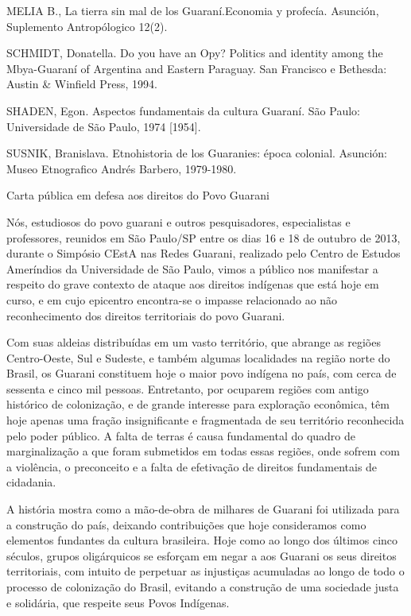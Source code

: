 \documentclass{article}
\begin{document}
MELIA B., La tierra sin mal de los Guaran\'i.Economia y profec\'ia.
Asunci\'on, Suplemento Antrop\'ologico 12(2).

SCHMIDT, Donatella. Do you have an Opy? Politics and identity among the
Mbya-Guaran\'i of Argentina and Eastern Paraguay. San Francisco e
Bethesda: Austin \& Winfield Press, 1994.

SHADEN, Egon. Aspectos fundamentais da cultura Guaran\'i. S\~ao Paulo:
Universidade de S\~ao Paulo, 1974 [1954].

SUSNIK, Branislava. Etnohistoria de los Guaranies: \'epoca colonial.
Asunci\'on: Museo Etnografico Andr\'es Barbero, 1979-1980.

Carta p\'ublica em defesa aos direitos do Povo Guarani

N\'os, estudiosos do povo guarani e outros pesquisadores, especialistas
e professores, reunidos em S\~ao Paulo/SP entre os dias 16 e 18 de
outubro de 2013, durante o Simp\'osio CEstA nas Redes Guarani,
realizado pelo Centro de Estudos Amer\'indios da Universidade de S\~ao
Paulo, vimos a p\'ublico nos manifestar a respeito do grave contexto de
ataque aos direitos ind\'igenas que est\'a hoje em curso, e em cujo
epicentro encontra-se o impasse relacionado ao n\~ao reconhecimento dos
direitos territoriais do povo Guarani.

Com suas aldeias distribu\'idas em um vasto territ\'orio, que abrange as
regi\~oes Centro-Oeste, Sul e Sudeste, e tamb\'em algumas localidades
na regi\~ao norte do Brasil, os Guarani constituem hoje o maior povo
ind\'igena no pa\'is, com cerca de sessenta e cinco mil pessoas.
Entretanto, por ocuparem regi\~oes com antigo hist\'orico de
coloniza\c{c}\~ao, e de grande interesse para explora\c{c}\~ao
econ\^omica, t\^em hoje apenas uma fra\c{c}\~ao insignificante e
fragmentada de seu territ\'orio reconhecida pelo poder p\'ublico. A
falta de terras \'e causa fundamental do quadro de marginaliza\c{c}\~ao
a que foram submetidos em todas essas regi\~oes, onde sofrem com a
viol\^encia, o preconceito e a falta de efetiva\c{c}\~ao de direitos
fundamentais de cidadania. 

A hist\'oria mostra como a m\~ao-de-obra de milhares de Guarani foi
utilizada para a constru\c{c}\~ao do pa\'is, deixando
contribui\c{c}\~oes que hoje consideramos como elementos fundantes da
cultura brasileira. Hoje como ao longo dos \'ultimos cinco s\'eculos,
grupos olig\'arquicos se esfor\c{c}am em negar a aos Guarani os seus
direitos territoriais, com intuito de perpetuar as injusti\c{c}as
acumuladas ao longo de todo o processo de coloniza\c{c}\~ao do Brasil,
evitando a constru\c{c}\~ao de uma sociedade justa e solid\'aria, que
respeite seus Povos Ind\'igenas.
\end{document}
